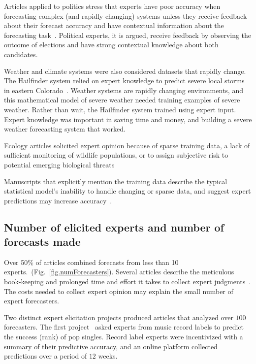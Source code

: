 \documentclass[preprint]{elsarticle}
\begin{document}
Articles applied to politics stress that experts have poor accuracy when forecasting complex (and rapidly changing) systems unless they receive feedback about their forecast accuracy and have contextual information about the forecasting task~\cite{graefe2014accuracy,graefe2015accuracy,graefe2018predicting,satopaa2014probability}.
Political experts, it is argued, receive feedback by observing the outcome of elections and have strong contextual knowledge about both candidates.  

Weather and climate systems were also considered datasets that rapidly change.
The Hailfinder system relied on expert knowledge to predict severe local storms in eastern Colorado~\cite{abramson1996hailfinder}.
Weather systems are rapidly changing environments, and this mathematical model of severe weather needed training examples of severe weather.
Rather than wait, the Hailfinder system trained using expert input.
Expert knowledge was important in saving time and money, and building a severe weather forecasting system that worked.

Ecology articles solicited expert opinion because of sparse training data, a lack of sufficient monitoring of wildlife populations, or to assign subjective risk to potential emerging biological threats~\cite{li2012preliminary,mantyka2014understanding,kurowicka2010probabilistic}

Manuscripts that explicitly mention the training data describe the typical statistical model's inability to handle changing or sparse data, and suggest expert predictions may increase accuracy~\cite{seifert2013relative,song2013combining}.

\subsection{Number of elicited experts and number of forecasts made}

Over 50\% of articles combined forecasts from less than 10 experts.~(Fig.~\ref{fig.numForecasters}).
Several articles describe the meticulous book-keeping and prolonged time and effort it takes to collect expert judgments~\cite{}.
The costs needed to collect expert opinion may explain the small number of expert forecasters.

Two distinct expert elicitation projects produced articles that analyzed over $100$ forecasters.
The first project~\cite{seifert2013relative} asked experts from music record labels to predict the success (rank) of pop singles.
Record label experts were incentivized with a summary of their predictive accuracy, and 
an online platform collected predictions over a period of $12$ weeks.
\end{document}
